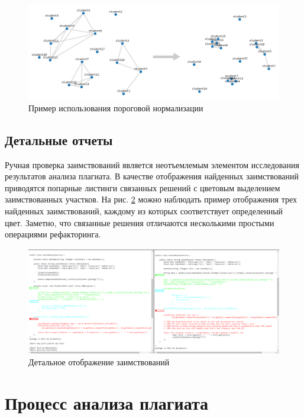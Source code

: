 \documentclass[a4paper,14pt]{extarticle}
\begin{document}
\begin{figure}[h!]
\centering
\includegraphics[width=1.0\textwidth]{graph_normalization.png}
\caption{Пример использования пороговой нормализации}
\label{fig:graph_normalization}
\end{figure}

\subsection{Детальные отчеты}

Ручная проверка заимствований является неотъемлемым элементом исследования результатов анализа плагиата. В качестве отображения найденных заимствований приводятся попарные листинги связанных решений с цветовым выделением заимствованных участков. На рис. \ref{fig:diff} можно наблюдать пример отображения трех найденных заимствований, каждому из которых соответствует определенный цвет. Заметно, что связанные решения отличаются несколькими простыми операциями рефакторинга.

\begin{figure}[h!]
\centering
\includegraphics[width=1.0\textwidth]{plagiarism_match.png}
\caption{Детальное отображение заимствований}
\label{fig:diff}
\end{figure}

\section{Процесс анализа плагиата}
\end{document}
